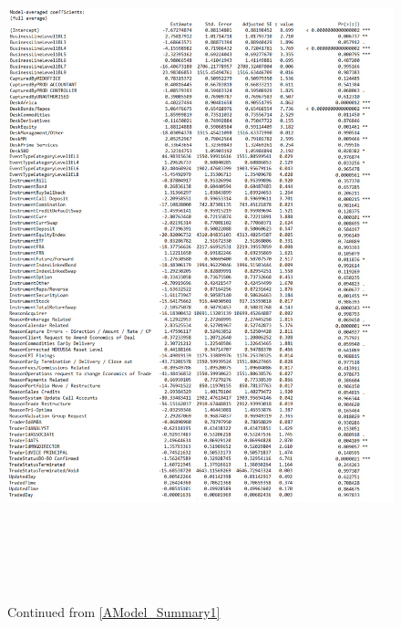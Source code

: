 \documentclass[
]{article}
\begin{document}
\begin{figure}
\centering
\includegraphics[height=20cm, width=15cm]{Get_models_bin2.pdf}
\caption[Poisson GLM Amodel summary statistics]{Continued from \ref{AModel_Summary1}}
\label{AModel_Summary2}
\end{figure}
\end{document}
